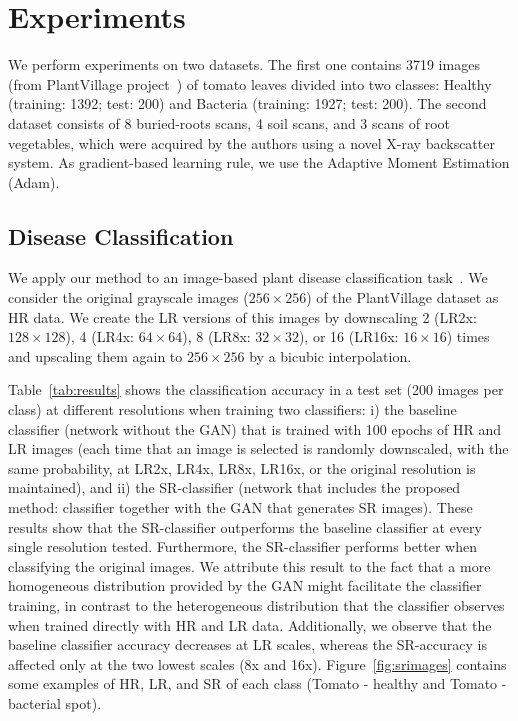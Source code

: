 \documentclass[10pt,twocolumn,letterpaper]{article}
\begin{document}
\section{Experiments}
\label{sec:experiments}

We perform experiments on two datasets. The first one contains 3719 images (from PlantVillage project~\cite{Hughes2015}) of tomato leaves divided into two classes: Healthy (training: 1392; test: 200) and Bacteria (training: 1927; test: 200). The second dataset consists of 8 buried-roots scans, 4 soil scans, and 3 scans of root vegetables, which were acquired by the authors using a novel X-ray backscatter system. As gradient-based learning rule, we use the Adaptive Moment Estimation (Adam).

\subsection{Disease Classification}

We apply our method to an image-based plant disease classification task~\cite{Mohanty2016}. We consider the original grayscale images ($256\times 256$) of the PlantVillage dataset as HR data. We create the LR versions of this images by downscaling 2 (LR2x: $128\times 128$), 4 (LR4x: $64\times 64$), 8 (LR8x: $32\times 32$), or 16 (LR16x: $16\times 16$) times and upscaling them again to $256\times 256$ by a bicubic interpolation.

Table~\ref{tab:results} shows the classification accuracy in a test set (200 images per class) at different resolutions when training two classifiers: i) the baseline classifier (network without the GAN) that is trained with 100 epochs of HR and LR images (each time that an image is selected is randomly downscaled, with the same probability, at LR2x, LR4x, LR8x, LR16x, or the original resolution is maintained), and ii) the SR-classifier (network that includes the proposed method: classifier together with the GAN that generates SR images). These results show that the SR-classifier outperforms the baseline classifier at every single resolution tested. Furthermore, the SR-classifier performs better when classifying the original images. We attribute this result to the fact that a more homogeneous distribution provided by the GAN might facilitate the classifier training, in contrast to the heterogeneous distribution that the classifier observes when trained directly with HR and LR data. Additionally, we observe that the baseline classifier accuracy decreases at LR scales, whereas the SR-accuracy is affected only at the two lowest scales (8x and 16x). Figure~\ref{fig:srimages} contains some examples of HR, LR, and SR of each class (Tomato - healthy and Tomato - bacterial spot).
\end{document}
